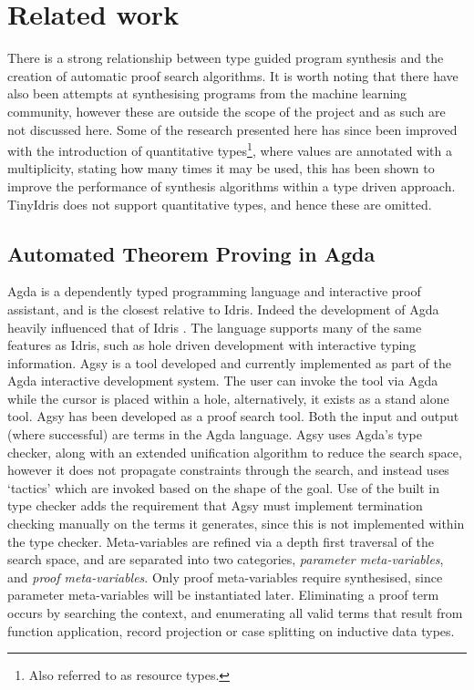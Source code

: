 \documentclass[a4paper]{article}
\begin{document}
\section{Related work}
\label{sec:org2631bdb}
There is a strong relationship between type guided program synthesis and the creation of automatic proof search algorithms.
It is worth noting that there have also been attempts at synthesising programs from the machine learning community, however these
are outside the scope of the project and as such are not discussed here. Some of the research presented here has since been 
improved with the introduction of quantitative types\footnote{Also referred to as resource types.}, where values are annotated with a multiplicity, stating how many 
times it may be used, this has been shown \cite{10.1145/3314221.3314602} to improve the performance of synthesis algorithms within
a type driven approach. TinyIdris does not support quantitative types, and hence these are omitted.

\subsection{Automated Theorem Proving in Agda}
\label{sec:orga26886a}
Agda is a dependently typed programming language and interactive proof assistant, and is the closest relative to Idris.
Indeed the development of Agda heavily influenced that of Idris \cite{Splv'202020Aug} . The language supports many
of the same features as Idris, such as hole driven development with interactive typing information. 
Agsy is a tool developed and currently implemented as part of the Agda interactive development system.
The user can invoke the tool via Agda while the cursor is placed within a hole, alternatively, it exists as a stand alone tool.
Agsy has been developed as a proof search tool.
Both the input and output (where successful) are terms in the Agda language. Agsy uses Agda's type checker,
along with an extended unification algorithm to reduce the search space, however it does not propagate constraints
through the search, and instead uses `tactics' which are invoked based on the shape of the goal. Use of the built in type
checker adds the requirement that Agsy must implement termination checking manually on the terms it generates, since this 
is not implemented within the type checker. Meta-variables are refined via a depth first traversal of the search space, and are separated into 
two categories, \emph{parameter meta-variables}, and \emph{proof meta-variables}. Only proof meta-variables require synthesised, since parameter 
meta-variables will be instantiated later. Eliminating a proof term occurs by searching the context,
and enumerating all valid terms that result from function application, record projection or case splitting on inductive data types.
\end{document}
